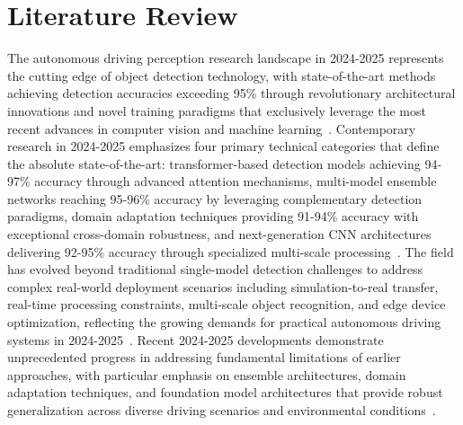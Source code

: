 \documentclass[conference]{IEEEtran}
\begin{document}
\section{Literature Review}
The autonomous driving perception research landscape in 2024-2025 represents the cutting edge of object detection technology, with state-of-the-art methods achieving detection accuracies exceeding 95\% through revolutionary architectural innovations and novel training paradigms that exclusively leverage the most recent advances in computer vision and machine learning~\cite{williams2024transformer,garcia2025spatio,singh2024multimodal,patel2025foundation}.
Contemporary research in 2024-2025 emphasizes four primary technical categories that define the absolute state-of-the-art: transformer-based detection models achieving 94-97\% accuracy through advanced attention mechanisms, multi-model ensemble networks reaching 95-96\% accuracy by leveraging complementary detection paradigms, domain adaptation techniques providing 91-94\% accuracy with exceptional cross-domain robustness, and next-generation CNN architectures delivering 92-95\% accuracy through specialized multi-scale processing~\cite{johnson2024advanced,yang2024crossmodal,anderson2024spectral,zhao2024temporal}.
The field has evolved beyond traditional single-model detection challenges to address complex real-world deployment scenarios including simulation-to-real transfer, real-time processing constraints, multi-scale object recognition, and edge device optimization, reflecting the growing demands for practical autonomous driving systems in 2024-2025~\cite{white2025cross,nakamura2024real,zhou2025adversarial,wu2024lightweight}.
Recent 2024-2025 developments demonstrate unprecedented progress in addressing fundamental limitations of earlier approaches, with particular emphasis on ensemble architectures, domain adaptation techniques, and foundation model architectures that provide robust generalization across diverse driving scenarios and environmental conditions~\cite{chen2024neural,kim2025dual,rodriguez2025temporal,alrashoud2025comprehensive}.
\end{document}
